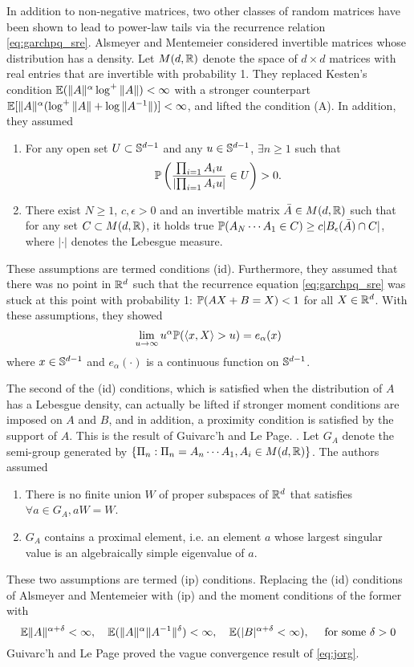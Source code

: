 In addition to non-negative matrices, two other classes of random
matrices have been shown to lead to power-law tails via the recurrence
relation \eqref{eq:garchpq_sre}. Alsmeyer and Mentemeier
\cite{alsmeyer:mentemeier:2012} considered invertible matrices whose
distribution has a density. Let $M(d, \reals)$ denote the space of
$d \times d$ matrices with real entries that are invertible with
probability 1. They replaced Kesten's condition
$\E (\|A\|^\alpha \log^+\|A\|) < \infty$ with a stronger
counterpart
$\E [\|A\|^\alpha (\log^+\|A\| + \log \|A^{-1} \|)] < \infty$,
and lifted the condition (A). In addition, they assumed
\begin{enumerate}
  \item For any open set $U \subset \sphere^{d-1}$ and any
    $u \in \sphere^{d-1}$,  $\exists n \geq 1$ such that
    \[
    \P\left({\prod_{i=1} A_i u
        \over
        \left|\prod_{i=1} A_i u\right|}\in U
    \right) > 0.
    \]
  \item There exist $N \geq 1$, $c, \epsilon > 0$ and an invertible
    matrix $\bar A \in M(d, \reals)$ such that for any set
    $C \subset M(d, \reals)$, it holds true
    $\P(A_N \cdots A_1 \in C) \geq c |B_\epsilon(\bar A) \cap C|$,
    where $|\cdot|$ denotes the Lebesgue measure.
\end{enumerate}
These assumptions are termed conditions (id). Furthermore, they assumed
that there was no point in $\reals^d$ such that the recurrence
equation \eqref{eq:garchpq_sre} was stuck at this point with probability 1: 
$\P(A X + B = X) < 1$ for all $X \in \reals^d$. With these
assumptions, they showed
\[
\lim_{u \to \infty} u^\alpha \P(\inn{x, X} > u) = e_\alpha(x)
\]
where $x \in \sphere^{d - 1}$ and $e_\alpha(\cdot)$ is a continuous
function on $\sphere^{d-1}$.

The second of the (id) conditions, which is satisfied when the
distribution of $A$ has a Lebesgue density, can actually be lifted if
stronger moment conditions are imposed on $A$ and $B$, and in
addition, a proximity condition is satisfied by the support of
$A$. This is the result of Guivarc'h and Le Page.
\cite{guivarc:page:2016}. Let $G_A$ denote the semi-group generated
by $\{\Pi_n: \Pi_n = A_n \cdots A_1, A_i \in M(d, \reals)\}$. The
authors assumed
\begin{enumerate}
  \item There is no finite union $W$ of proper subspaces of $\reals^d$
    that satisfies $\forall a \in G_A, a W = W$.
  \item $G_A$ contains a proximal element, i.e. an element $a$ whose
    largest singular value is an algebraically simple eigenvalue of $a$.
\end{enumerate}
These two assumptions are termed (ip) conditions. Replacing the (id)
conditions of Alsmeyer and Mentemeier with (ip) and the moment
conditions of the former with
\[
\E \|A\|^{\alpha + \delta} < \infty, \quad
\E (\|A\|^{\alpha} \|A^{-1}\|^{\delta}) < \infty, \quad
\E (|B|^{\alpha + \delta} < \infty),\quad
\text{ for some }\delta > 0
\]
Guivarc'h and Le Page proved the vague convergence result of \eqref{eq:jorg}.

